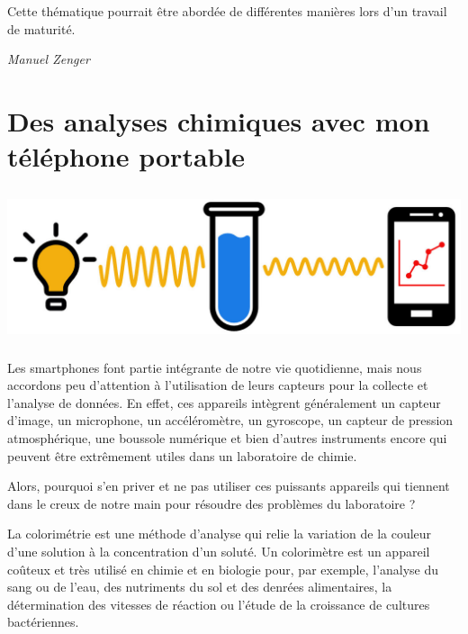 \documentclass[
  10pt,
  french,
  a5paper,
  openany]{book}
\newenvironment{signature}{\begin{flushright}}{\end{flushright}}
\begin{document}
Cette thématique pourrait être abordée de différentes manières lors d'un travail de maturité.

\begin{signature}
\emph{Manuel Zenger}

\end{signature}

\hypertarget{des-analyses-chimiques-avec-mon-tuxe9luxe9phone-portable}{%
\chapter{\texorpdfstring{Des analyses chimiques \linebreak avec mon téléphone portable}{Des analyses chimiques avec mon téléphone portable}}\label{des-analyses-chimiques-avec-mon-tuxe9luxe9phone-portable}}

\begin{center}
\includegraphics[width=\textwidth,height=12em]{images/analyses-chimiques-telephone-portable.jpg}

\end{center}

Les smartphones font partie intégrante de notre vie quotidienne, mais nous accordons peu d'attention à l'utilisation de leurs capteurs pour la collecte et l'analyse de données. En effet, ces appareils intègrent généralement un capteur d'image, un microphone, un accéléromètre, un gyroscope, un capteur de pression atmosphérique, une boussole numérique et bien d'autres instruments encore qui peuvent être extrêmement utiles dans un laboratoire de chimie.

Alors, pourquoi s'en priver et ne pas utiliser ces puissants appareils qui tiennent dans le creux de notre main pour résoudre des problèmes du laboratoire ?

La colorimétrie est une méthode d'analyse qui relie la variation de la couleur d'une solution à la concentration d'un soluté. Un colorimètre est un appareil coûteux et très utilisé en chimie et en biologie pour, par exemple, l'analyse du sang ou de l'eau, des nutriments du sol et des denrées alimentaires, la détermination des vitesses de réaction ou l'étude de la croissance de cultures bactériennes.
\end{document}

